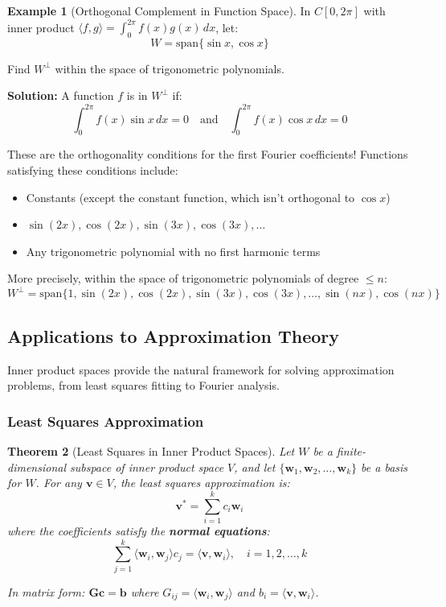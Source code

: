 \documentclass[12pt]{article}
\numberwithin{equation}{section}
\newcommand{\vect}[1]{\boldsymbol{#1}}   %
\newcommand{\mat}[1]{\mathbf{#1}}        %
\theoremstyle{plain}
\newtheorem{theorem}{Theorem}[section]
\theoremstyle{definition}
\newtheorem{example}[theorem]{Example}
\theoremstyle{remark}
\begin{document}
\begin{example}[Orthogonal Complement in Function Space]
In $C[0, 2\pi]$ with inner product $\langle f, g \rangle = \int_0^{2\pi} f(x)g(x) \, dx$, let:
$$W = \text{span}\{\sin x, \cos x\}$$

Find $W^{\perp}$ within the space of trigonometric polynomials.

\textbf{Solution:} A function $f$ is in $W^{\perp}$ if:
$$\int_0^{2\pi} f(x) \sin x \, dx = 0 \quad \text{and} \quad \int_0^{2\pi} f(x) \cos x \, dx = 0$$

These are the orthogonality conditions for the first Fourier coefficients! Functions satisfying these conditions include:
\begin{itemize}
\item Constants (except the constant function, which isn't orthogonal to $\cos x$)
\item $\sin(2x), \cos(2x), \sin(3x), \cos(3x), \ldots$
\item Any trigonometric polynomial with no first harmonic terms
\end{itemize}

More precisely, within the space of trigonometric polynomials of degree $\leq n$:
$$W^{\perp} = \text{span}\{1, \sin(2x), \cos(2x), \sin(3x), \cos(3x), \ldots, \sin(nx), \cos(nx)\}$$
\end{example}

\subsection{Applications to Approximation Theory}

Inner product spaces provide the natural framework for solving approximation problems, from least squares fitting to Fourier analysis.

\subsubsection{Least Squares Approximation}

\begin{theorem}[Least Squares in Inner Product Spaces]
Let $W$ be a finite-dimensional subspace of inner product space $V$, and let $\{\vect{w}_1, \vect{w}_2, \ldots, \vect{w}_k\}$ be a basis for $W$. For any $\vect{v} \in V$, the least squares approximation is:
$$\vect{v}^* = \sum_{i=1}^k c_i \vect{w}_i$$
where the coefficients satisfy the \textbf{normal equations}:
$$\sum_{j=1}^k \langle \vect{w}_i, \vect{w}_j \rangle c_j = \langle \vect{v}, \vect{w}_i \rangle, \quad i = 1, 2, \ldots, k$$

In matrix form: $\mat{G}\vect{c} = \vect{b}$ where $G_{ij} = \langle \vect{w}_i, \vect{w}_j \rangle$ and $b_i = \langle \vect{v}, \vect{w}_i \rangle$.
\end{theorem}
\end{document}
